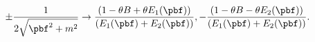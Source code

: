 \begin{equation}
\pm \frac{1}{2\sqrt{\pbf^2+m^2}}\to 
\frac{(1-\theta B+\theta E_1(\pbf))}{(E_1(\pbf)+E_2(\pbf))},
-\frac{(1-\theta B-\theta E_2(\pbf))}{(E_1(\pbf)+E_2(\pbf))}.
\end{equation}

